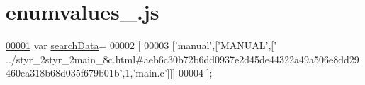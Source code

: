 \hypertarget{enumvalues__7_8js_source}{}\section{enumvalues\+\_.\+js}
\label{enumvalues__7_8js_source}

\begin{DoxyCode}
\hypertarget{enumvalues__7_8js_source.tex_l00001}{}\hyperlink{enumvalues__7_8js_ad01a7523f103d6242ef9b0451861231e}{00001} var \hyperlink{enumvalues__7_8js_ad01a7523f103d6242ef9b0451861231e}{searchData}=
00002 [
00003   [\textcolor{stringliteral}{'manual'},[\textcolor{stringliteral}{'MANUAL'},[\textcolor{stringliteral}{'
      ../styr\_2styr\_2main\_8c.html#aeb6c30b72b6dd0937e2d45de44322a49a506e8dd29460ea318b68d035f679b01b'},1,\textcolor{stringliteral}{'main.c'}]]]
00004 ];
\end{DoxyCode}
